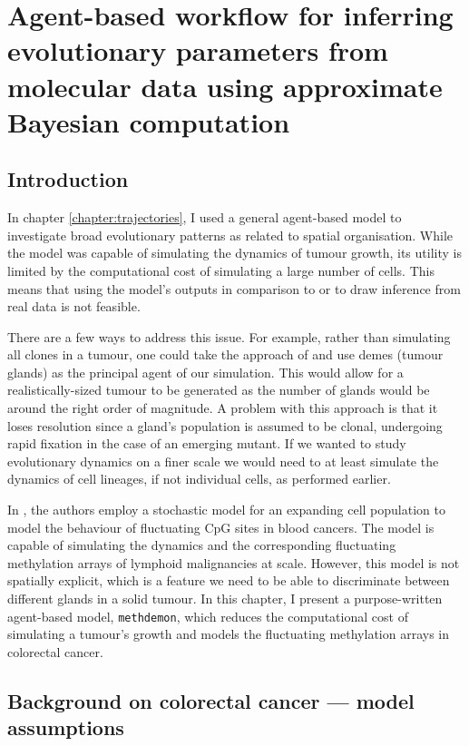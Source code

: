 \chapter{Agent-based workflow for inferring evolutionary parameters from molecular data using approximate Bayesian computation}\label{chapter:methdemon}


\section{Introduction}
In chapter \ref{chapter:trajectories}, I used a general agent-based model to investigate broad evolutionary
patterns as related to spatial organisation. While the model was capable of simulating the dynamics of
tumour growth, its utility is limited by the computational cost of simulating a large number of cells. This means
that using the model's outputs in comparison to or to draw inference from real data is not feasible. \par
There are a few ways to address this issue. For example, rather than simulating all clones in a tumour, one
could take the approach of \cite{sottoriva_big_2015} and use demes (tumour glands) as the principal agent of our
simulation. This would allow for a realistically-sized tumour to be generated as the number of glands would
be around the right order of magnitude. A problem with this approach is that it loses resolution since a
gland's population is assumed to be clonal, undergoing rapid fixation in the case of an emerging mutant. If we wanted to
study evolutionary dynamics on a finer scale we would need to at least simulate the dynamics of cell
lineages, if not individual cells, as performed earlier. \par
In \cite{gabbutt_evolutionary_2023}, the authors employ a stochastic model for an expanding cell population
to model the behaviour of fluctuating CpG sites in blood cancers. The model is capable of simulating the
dynamics and the corresponding fluctuating methylation arrays of lymphoid malignancies at scale. However,
this model is not spatially explicit, which is a feature we need to be able to discriminate between different
glands in a solid tumour. In this chapter, I present a purpose-written agent-based model, \texttt{methdemon},
which reduces the computational cost of simulating a tumour's growth and models the fluctuating
methylation arrays in colorectal cancer.


\section{Background on colorectal cancer --- model assumptions}

